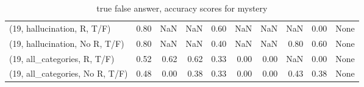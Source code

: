 \begin{table*}[h!]
\begin{adjustbox}{width=2\columnwidth,center}
\begin{tabular}{lrrr|rrr|rrr}
(19, hallucination, R, T/F)           &                      0.80 &                   NaN &                       NaN &                          0.60 &                       NaN &                           NaN &                                    NaN &                               0.00 &                                  None \\
(19, hallucination, No R, T/F)        &                      0.80 &                   NaN &                       NaN &                          0.40 &                       NaN &                           NaN &                                   0.80 &                               0.60 &                                  None \\
(19, all\_categories, R, T/F)          &                      0.52 &                  0.62 &                      0.62 &                          0.33 &                      0.00 &                          0.00 &                                    NaN &                               0.00 &                                  None \\
(19, all\_categories, No R, T/F)       &                      0.48 &                  0.00 &                      0.38 &                          0.33 &                      0.00 &                          0.00 &                                   0.43 &                               0.38 &                                  None \\


\bottomrule
\end{tabular}
\end{adjustbox}
\caption{true false answer, accuracy scores for mystery}
\end{table*}